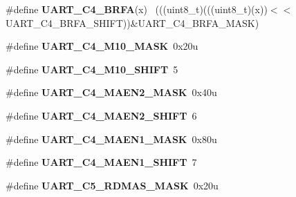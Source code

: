 \begin{DoxyCompactItemize}
\item 
\hypertarget{group___u_a_r_t___register___masks_gabb5bd76ed3b85ff1d95199471f59cb7b}{}\#define {\bfseries U\+A\+R\+T\+\_\+\+C4\+\_\+\+B\+R\+F\+A}(x)                                                ~(((uint8\+\_\+t)(((uint8\+\_\+t)(x))$<$$<$U\+A\+R\+T\+\_\+\+C4\+\_\+\+B\+R\+F\+A\+\_\+\+S\+H\+I\+F\+T))\&U\+A\+R\+T\+\_\+\+C4\+\_\+\+B\+R\+F\+A\+\_\+\+M\+A\+S\+K)\label{group___u_a_r_t___register___masks_gabb5bd76ed3b85ff1d95199471f59cb7b}

\item 
\hypertarget{group___u_a_r_t___register___masks_ga9e9d5093d6aec7bd4c3f418ee54f8801}{}\#define {\bfseries U\+A\+R\+T\+\_\+\+C4\+\_\+\+M10\+\_\+\+M\+A\+S\+K}~0x20u\label{group___u_a_r_t___register___masks_ga9e9d5093d6aec7bd4c3f418ee54f8801}

\item 
\hypertarget{group___u_a_r_t___register___masks_gafd4cf70aa0988a96e3744eae7a0f036d}{}\#define {\bfseries U\+A\+R\+T\+\_\+\+C4\+\_\+\+M10\+\_\+\+S\+H\+I\+F\+T}~5\label{group___u_a_r_t___register___masks_gafd4cf70aa0988a96e3744eae7a0f036d}

\item 
\hypertarget{group___u_a_r_t___register___masks_gac1c8fa0730a887b5d4d43f426b27c955}{}\#define {\bfseries U\+A\+R\+T\+\_\+\+C4\+\_\+\+M\+A\+E\+N2\+\_\+\+M\+A\+S\+K}~0x40u\label{group___u_a_r_t___register___masks_gac1c8fa0730a887b5d4d43f426b27c955}

\item 
\hypertarget{group___u_a_r_t___register___masks_ga5ec71022d0264fefd4c63118d90adbb2}{}\#define {\bfseries U\+A\+R\+T\+\_\+\+C4\+\_\+\+M\+A\+E\+N2\+\_\+\+S\+H\+I\+F\+T}~6\label{group___u_a_r_t___register___masks_ga5ec71022d0264fefd4c63118d90adbb2}

\item 
\hypertarget{group___u_a_r_t___register___masks_gaa345d5da303c56b2881394dc0e003337}{}\#define {\bfseries U\+A\+R\+T\+\_\+\+C4\+\_\+\+M\+A\+E\+N1\+\_\+\+M\+A\+S\+K}~0x80u\label{group___u_a_r_t___register___masks_gaa345d5da303c56b2881394dc0e003337}

\item 
\hypertarget{group___u_a_r_t___register___masks_ga28655a6deae1adc48798c91db8ce24e1}{}\#define {\bfseries U\+A\+R\+T\+\_\+\+C4\+\_\+\+M\+A\+E\+N1\+\_\+\+S\+H\+I\+F\+T}~7\label{group___u_a_r_t___register___masks_ga28655a6deae1adc48798c91db8ce24e1}

\item 
\hypertarget{group___u_a_r_t___register___masks_gaef3503f3521ec37397d2d19e7da7bd58}{}\#define {\bfseries U\+A\+R\+T\+\_\+\+C5\+\_\+\+R\+D\+M\+A\+S\+\_\+\+M\+A\+S\+K}~0x20u\label{group___u_a_r_t___register___masks_gaef3503f3521ec37397d2d19e7da7bd58}


\end{DoxyCompactItemize}
